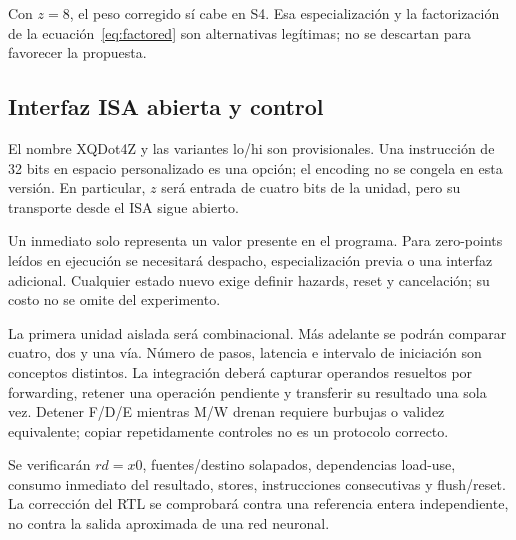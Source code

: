 \begin{center}
\end{center}
Con \(z=8\), el peso corregido sí cabe en S4. Esa especialización y la
factorización de la ecuación~\eqref{eq:factored} son alternativas legítimas;
no se descartan para favorecer la propuesta.

\subsection{Interfaz ISA abierta y control}
El nombre XQDot4Z y las variantes lo/hi son provisionales. Una instrucción
de 32 bits en espacio personalizado es una opción; el encoding no se congela
en esta versión. En particular, \(z\) será entrada de cuatro bits de la unidad,
pero su transporte desde el ISA sigue abierto.

Un inmediato solo representa un valor presente en el programa. Para zero-points
leídos en ejecución se necesitará despacho, especialización previa o una interfaz
adicional. Cualquier estado nuevo exige definir hazards, reset y cancelación;
su costo no se omite del experimento.

La primera unidad aislada será combinacional. Más adelante se podrán comparar
cuatro, dos y una vía. Número de pasos, latencia e intervalo de iniciación
son conceptos distintos. La integración deberá capturar operandos resueltos
por forwarding, retener una operación pendiente y transferir su resultado
una sola vez. Detener F/D/E mientras M/W drenan requiere burbujas o validez
equivalente; copiar repetidamente controles no es un protocolo correcto.

Se verificarán \(rd=x0\), fuentes/destino solapados, dependencias load-use,
consumo inmediato del resultado, stores, instrucciones consecutivas y flush/reset.
La corrección del RTL se comprobará contra una referencia entera independiente,
no contra la salida aproximada de una red neuronal.
